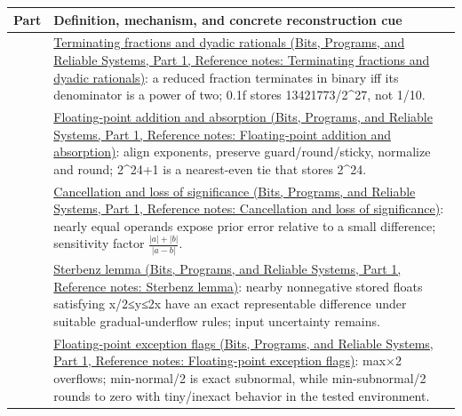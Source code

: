 {\def\LTcaptype{none} %
\begin{longtable}[]{@{}
  >{\raggedright\arraybackslash}p{}
  >{\raggedright\arraybackslash}p{}@{}}
\toprule\noalign{}
\begin{minipage}[b]{\linewidth}\raggedright
Part
\end{minipage} & \begin{minipage}[b]{\linewidth}\raggedright
Definition, mechanism, and concrete reconstruction cue
\end{minipage} \\
\midrule\noalign{}
\endhead
\bottomrule\noalign{}
\endlastfoot
77 & \href{../01-Bits-Programs-and-Reliable-Systems-P01/main.pdf\#appendix-2a2f1b74bdd3}{Terminating fractions and dyadic rationals (Bits, Programs, and Reliable Systems, Part 1, Reference notes: Terminating fractions and dyadic rationals)}: a reduced fraction terminates in binary iff its denominator is a power of two; 0.1f stores 13421773/2\^{}27, not 1/10. \\
78 & \href{../01-Bits-Programs-and-Reliable-Systems-P01/main.pdf\#appendix-a1b1b4580dfd}{Floating-point addition and absorption (Bits, Programs, and Reliable Systems, Part 1, Reference notes: Floating-point addition and absorption)}: align exponents, preserve guard/round/sticky, normalize and round; 2\^{}24+1 is a nearest-even tie that stores 2\^{}24. \\
79 & \href{../01-Bits-Programs-and-Reliable-Systems-P01/main.pdf\#appendix-a2773a6a2f9d}{Cancellation and loss of significance (Bits, Programs, and Reliable Systems, Part 1, Reference notes: Cancellation and loss of significance)}: nearly equal operands expose prior error relative to a small difference; sensitivity factor \(\frac{\lvert a\rvert+\lvert b\rvert}{\lvert a-b\rvert}\). \\
80 & \href{../01-Bits-Programs-and-Reliable-Systems-P01/main.pdf\#appendix-399b7ad53f39}{Sterbenz lemma (Bits, Programs, and Reliable Systems, Part 1, Reference notes: Sterbenz lemma)}: nearby nonnegative stored floats satisfying x/2≤y≤2x have an exact representable difference under suitable gradual-underflow rules; input uncertainty remains. \\
81 & \href{../01-Bits-Programs-and-Reliable-Systems-P01/main.pdf\#appendix-ed8531b46754}{Floating-point exception flags (Bits, Programs, and Reliable Systems, Part 1, Reference notes: Floating-point exception flags)}: max×2 overflows; min-normal/2 is exact subnormal, while min-subnormal/2 rounds to zero with tiny/inexact behavior in the tested environment. \\

\end{longtable}}
